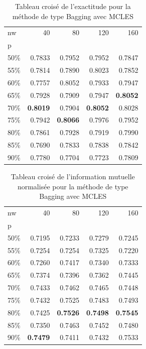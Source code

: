 	\begin{table}[h!]
  		 \caption{Tableau croisé de l'exactitude pour la méthode de type Bagging avec MCLES}
  		 \centering
  		 \begin{tabular}{lrrrr}
    	\toprule
    	nw & 40 & 80 & 120 & 160 \\
    	p &  &  &  &  \\
    	\midrule
    	50\% & 0.7833 & 0.7952 & 0.7952 & 0.7847 \\
    	55\% & 0.7814 & 0.7890 & 0.8023 & 0.7852 \\
    	60\% & 0.7757 & 0.8052 & 0.7933 & 0.7947 \\
    	65\% & 0.7928 & 0.7909 & 0.7947 & \textbf{0.8052} \\
    	70\% & \textbf{0.8019} & 0.7904 & \textbf{0.8052} & 0.8028 \\
    	75\% & 0.7942 & \textbf{0.8066} & 0.7976 & 0.7952 \\
    	80\% & 0.7861 & 0.7928 & 0.7919 & 0.7990 \\
    	85\% & 0.7690 & 0.7833 & 0.7838 & 0.7842 \\
    	90\% & 0.7780 & 0.7704 & 0.7723 & 0.7809 \\
    	\bottomrule
    	\end{tabular}
  		 \label{table:acc_mcles}
	\end{table}

	\begin{table}[h!]
  		 \caption{Tableau croisé de l'information mutuelle normalisée pour la méthode de type Bagging avec MCLES}
  		 \centering
    	\begin{tabular}{lrrrr}
    	\toprule
    	nw & 40 & 80 & 120 & 160 \\
    	p &  &  &  &  \\
    	\midrule
    	50\% & 0.7195 & 0.7233 & 0.7279 & 0.7245 \\
    	55\% & 0.7254 & 0.7254 & 0.7325 & 0.7220 \\
    	60\% & 0.7260 & 0.7417 & 0.7340 & 0.7333 \\
    	65\% & 0.7374 & 0.7396 & 0.7362 & 0.7445 \\
    	70\% & 0.7433 & 0.7462 & 0.7465 & 0.7448 \\
    	75\% & 0.7432 & 0.7525 & 0.7483 & 0.7493 \\
    	80\% & 0.7425 & \textbf{0.7526} & \textbf{0.7498} & \textbf{0.7545} \\
    	85\% & 0.7350 & 0.7463 & 0.7452 & 0.7480 \\
    	90\% & \textbf{0.7479} & 0.7411 & 0.7432 & 0.7533 \\
    	\bottomrule
    	\end{tabular}
  		 \label{table:nmi_mcles}
	\end{table}

